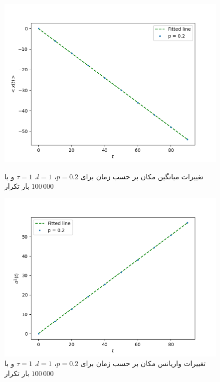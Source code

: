 \documentclass[11pt, a4paper]{article}
\begin{document}
\begin{figure}[h!]
	\centering
  \begin{minipage}[b]{0.48\textwidth}
    \includegraphics[width=\textwidth]{q2_x_0.2_100_10_100000.png}
    \caption{تغییرات میانگین مکان بر حسب زمان برای $p = 0.2$، $l = 1$، $\tau = 1$ و با $100\,000$ بار تکرار}
    \label{fig:q2_0.2_x}
  \end{minipage}
  \hfill
  \begin{minipage}[b]{0.48\textwidth}
    \includegraphics[width=\textwidth]{q2_var_0.2_100_10_100000.png}
    \caption{تغییرات واریانس مکان بر حسب زمان برای $p = 0.2$، $l = 1$، $\tau = 1$ و با $100\,000$ بار تکرار}
    \label{fig:q2_0.2_var}
  \end{minipage}

\end{figure}
\end{document}
